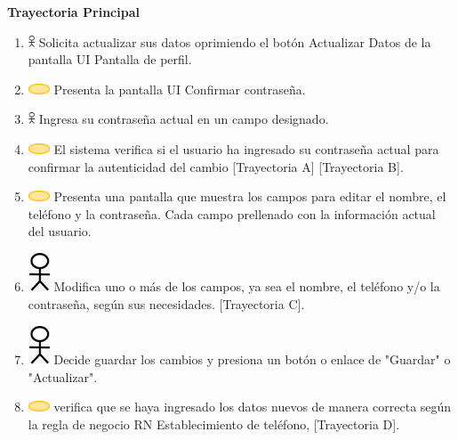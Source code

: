 \textbf{Trayectoria Principal}
\begin{enumerate}
    \item \includegraphics[width=0.0150\textwidth]{Figuras/persona.png} Solicita actualizar sus datos oprimiendo el botón Actualizar Datos de la pantalla UI Pantalla de perfil.
    \item \includegraphics[width=0.0500\textwidth]{Figuras/sistema.png} Presenta la pantalla UI Confirmar contraseña.
    \item \includegraphics[width=0.0150\textwidth]{Figuras/persona.png} Ingresa su contraseña actual en un campo designado.
    \item \includegraphics[width=0.0500\textwidth]{Figuras/sistema.png} El sistema verifica si el usuario ha ingresado su contraseña actual para confirmar la autenticidad del cambio [Trayectoria A] [Trayectoria B].
     \item \includegraphics[width=0.0500\textwidth]{Figuras/sistema.png} Presenta una pantalla que muestra los campos para editar el nombre, el teléfono y la contraseña. Cada campo prellenado con la información actual del usuario. 
    \item \includegraphics[width=0.0500\textwidth]{Figuras/persona.png} Modifica uno o más de los campos, ya sea el nombre, el teléfono y/o la contraseña, según sus necesidades. [Trayectoria C].
    \item \includegraphics[width=0.0500\textwidth]{Figuras/persona.png} Decide guardar los cambios y presiona un botón o enlace de "Guardar" o "Actualizar".
    \item \includegraphics[width=0.0500\textwidth]{Figuras/sistema.png} verifica que se haya ingresado los datos nuevos de manera correcta según la regla de negocio RN Establecimiento de teléfono, [Trayectoria D].

\end{enumerate}
